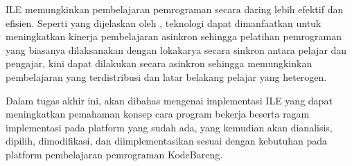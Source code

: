 ILE memungkinkan pembelajaran pemrograman secara daring lebih efektif dan efisien. Seperti yang dijelaskan oleh \textcite{choy2004interactive}, teknologi dapat dimanfaatkan untuk meningkatkan kinerja pembelajaran asinkron sehingga pelatihan pemrograman yang biasanya dilaksanakan dengan lokakarya secara sinkron antara pelajar dan pengajar, kini dapat dilakukan secara asinkron sehingga memungkinkan pembelajaran yang terdistribusi dan latar belakang pelajar yang heterogen.


Dalam tugas akhir ini, akan dibahas mengenai implementasi ILE yang dapat meningkatkan pemahaman konsep cara program bekerja beserta ragam implementasi pada platform yang sudah ada, yang kemudian akan dianalisis, dipilih, dimodifikasi, dan diimplementasikan sesuai dengan kebutuhan pada platform pembelajaran pemrograman KodeBareng.



